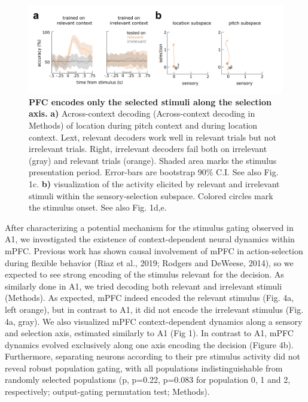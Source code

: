 \documentclass[12pt]{article}
\begin{document}
\begin{figure}
\centering
        \includegraphics[width=\textwidth]{figures/Fig4.pdf}
    \caption{\textbf{PFC encodes only the selected stimuli along the selection axis.} \textbf{a)} Across-context decoding (Across-context decoding in Methods) of location during pitch context and during location context. Lext, relevant decoders work well in relevant trials but not irrelevant trials. Right, irrelevant decoders fail both on irrelevant (gray) and relevant trials (orange). Shaded area marks the stimulus presentation period. Error-bars are bootstrap 90\% C.I. See also Fig. 1c. \textbf{b)}  visualization of the activity elicited by relevant and irrelevant stimuli within the sensory-selection subspace. Colored circles mark the stimulus onset. See also Fig. 1d,e.} 
    \label{fig4}
\end{figure}

After characterizing a potential mechanism for the stimulus gating observed in A1, we investigated the existence of context-dependent neural dynamics within mPFC. Previous work has shown causal involvement of mPFC in action-selection during flexible behavior (Riaz et al., 2019; Rodgers and DeWeese, 2014), so we expected to see strong encoding of the stimulus relevant for the decision. As similarly done in A1, we tried decoding both relevant and irrelevant stimuli (Methods). As expected, mPFC indeed encoded the relevant stimulus (Fig. 4a, left orange), but in contrast to A1, it did not encode the irrelevant stimulus (Fig. 4a, gray). We also visualized mPFC context-dependent dynamics along a sensory and selection axis, estimated similarly to A1 (Fig 1). In contrast to A1, mPFC dynamics evolved exclusively along one axis encoding the decision (Figure 4b). Furthermore, separating neurons according to their pre stimulus activity did not reveal robust population gating, with all populations indistinguishable from randomly selected populations (p, p=0.22, p=0.083 for population 0, 1 and 2, respectively; output-gating permutation test; Methods). \\
\end{document}
